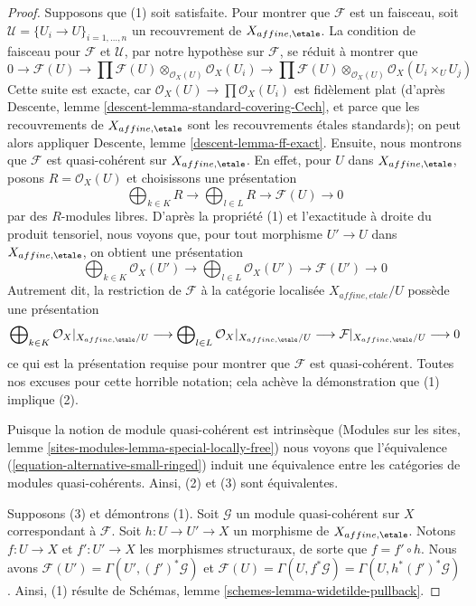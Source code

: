 \begin{proof}
Supposons que (1) soit satisfaite. Pour montrer que $\mathcal{F}$ est un faisceau, soit
$\mathcal{U} = \{U_i \to U\}_{i = 1, \ldots, n}$ un recouvrement
de $X_{affine, \etale}$. La condition de faisceau pour $\mathcal{F}$
et $\mathcal{U}$, par notre hypothèse sur $\mathcal{F}$,
se réduit à montrer que
$$
0 \to \mathcal{F}(U) \to
\prod \mathcal{F}(U) \otimes_{\mathcal{O}_X(U)} \mathcal{O}_X(U_i) \to
\prod \mathcal{F}(U) \otimes_{\mathcal{O}_X(U)} \mathcal{O}_X(U_i \times_U U_j)
$$
Cette suite est exacte, car $\mathcal{O}_X(U) \to \prod \mathcal{O}_X(U_i)$
est fidèlement plat
(d'après Descente, lemme \ref{descent-lemma-standard-covering-Cech}, et parce que
les recouvrements de $X_{affine, \etale}$ sont les recouvrements \'etales
standards); on peut alors appliquer Descente, lemme \ref{descent-lemma-ff-exact}.
Ensuite, nous montrons que $\mathcal{F}$ est quasi-cohérent sur $X_{affine, \etale}$.
En effet, pour $U$ dans $X_{affine, \etale}$, posons $R = \mathcal{O}_X(U)$
et choisissons une présentation
$$
\bigoplus\nolimits_{k \in K} R
\longrightarrow
\bigoplus\nolimits_{l \in L} R
\longrightarrow
\mathcal{F}(U)
\longrightarrow 0
$$
par des $R$-modules libres. D'après la propriété (1) et l'exactitude à droite du produit tensoriel,
nous voyons que, pour tout morphisme $U' \to U$ dans $X_{affine, \etale}$,
on obtient une présentation
$$
\bigoplus\nolimits_{k \in K} \mathcal{O}_X(U')
\longrightarrow
\bigoplus\nolimits_{l \in L} \mathcal{O}_X(U')
\longrightarrow
\mathcal{F}(U')
\longrightarrow 0
$$
Autrement dit, la restriction de $\mathcal{F}$
à la catégorie localisée $X_{affine, etale}/U$ possède une présentation
$$
\bigoplus\nolimits_{k \in K} \mathcal{O}_X|_{X_{affine, \etale}/U}
\longrightarrow
\bigoplus\nolimits_{l \in L} \mathcal{O}_X|_{X_{affine, \etale}/U}
\longrightarrow
\mathcal{F}|_{X_{affine, \etale}/U}
\longrightarrow 0
$$
ce qui est la présentation requise pour montrer que $\mathcal{F}$ est quasi-cohérent.
Toutes nos excuses pour cette horrible notation; cela achève la démonstration
que (1) implique (2).

\medskip\noindent
Puisque la notion de module quasi-cohérent est intrinsèque
(Modules sur les sites, lemme \ref{sites-modules-lemma-special-locally-free})
nous voyons que l'équivalence (\ref{equation-alternative-small-ringed})
induit une équivalence entre les catégories de modules quasi-cohérents.
Ainsi, (2) et (3) sont équivalentes.

\medskip\noindent
Supposons (3) et démontrons (1). Soit
$\mathcal{G}$ un module quasi-cohérent sur $X$ correspondant à $\mathcal{F}$.
Soit $h : U \to U' \to X$ un morphisme de $X_{affine, \etale}$.
Notons $f : U \to X$ et $f' : U' \to X$ les morphismes structuraux,
de sorte que $f = f' \circ h$. Nous avons
$\mathcal{F}(U') = \Gamma(U', (f')^*\mathcal{G})$ et
$\mathcal{F}(U) = \Gamma(U, f^*\mathcal{G}) = \Gamma(U, h^*(f')^*\mathcal{G})$.
Ainsi, (1) résulte de Schémas, lemme \ref{schemes-lemma-widetilde-pullback}.
\end{proof}
